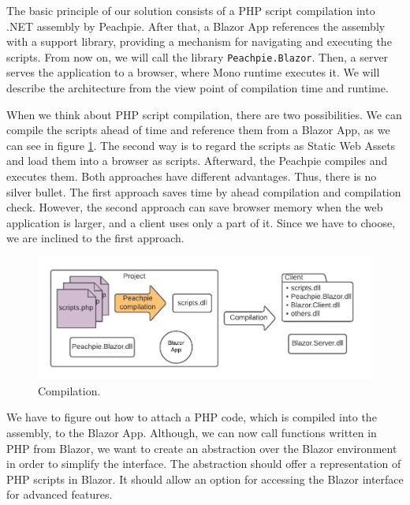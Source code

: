 The basic principle of our solution consists of a PHP script compilation into .NET assembly by Peachpie.
After that, a Blazor App references the assembly with a support library, providing a mechanism for navigating and executing the scripts.
From now on, we will call the library \texttt{Peachpie.Blazor}.
Then, a server serves the application to a browser, where Mono runtime executes it.
We will describe the architecture from the view point of compilation time and runtime.
\par
When we think about PHP script compilation, there are two possibilities.
We can compile the scripts ahead of time and reference them from a Blazor App, as we can see in figure \ref{img11:compilation}. 
The second way is to regard the scripts as Static Web Assets and load them into a browser as scripts.
Afterward, the Peachpie compiles and executes them.
Both approaches have different advantages. 
Thus, there is no silver bullet.
The first approach saves time by ahead compilation and compilation check.
However, the second approach can save browser memory when the web application is larger, and a client uses only a part of it.
Since we have to choose, we are inclined to the first approach.
\par
{}
\begin{figure}[!b]\centering
\includegraphics[scale=0.8]{./img/Compilation}
\caption{Compilation.}
\label{img11:compilation}
\end{figure} 
\par
We have to figure out how to attach a PHP code, which is compiled into the assembly, to the Blazor App.
Although, we can now call functions written in PHP from Blazor, we want to create an abstraction over the Blazor environment in order to simplify the interface.
The abstraction should offer a representation of PHP scripts in Blazor.
It should allow an option for accessing the Blazor interface for advanced features.
